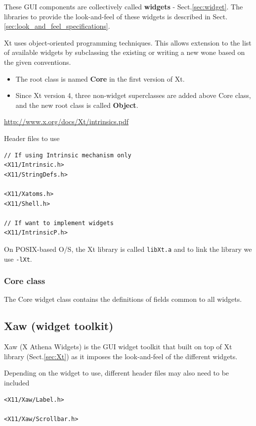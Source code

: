 These GUI components are collectively called {\bf widgets} -
Sect.\ref{sec:widget}. The libraries to provide the look-and-feel of these
widgets is described in Sect.\ref{sec:look_and_feel_specifications}.

Xt uses object-oriented programming techniques. This
allows extension to the list of available widgets by subclassing the existing or
writing a new wone based on the given conventions.
\begin{itemize}
  \item The root class is named {\bf Core} in the first version of Xt.
  
  \item Since Xt version 4, three non-widget superclasses are added above Core
  class, and the new root class is called {\bf Object}.
\end{itemize}
\url{http://www.x.org/docs/Xt/intrinsics.pdf}

Header files to use
\begin{verbatim}
// If using Intrinsic mechanism only
<X11/Intrinsic.h>
<X11/StringDefs.h>

<X11/Xatoms.h>
<X11/Shell.h>

// If want to implement widgets
<X11/IntrinsicP.h>
\end{verbatim}

\begin{mdframed}

On POSIX-based O/S, the Xt library is called \verb!libXt.a! and to link the
library we use \verb!-lXt!.
\end{mdframed}

\subsubsection{Core class}
\label{sec:Core_class}

The Core widget class contains the definitions of fields common to all widgets.


\subsection{Xaw (widget toolkit)}
\label{sec:Xaw}

Xaw (X Athena Widgets) is the GUI widget toolkit that built on top of Xt
library (Sect.\ref{sec:Xt}) as it imposes the look-and-feel of the different
widgets.

Depending on the widget to use, different header
files may also need to be included
\begin{verbatim}
<X11/Xaw/Label.h>

<X11/Xaw/Scrollbar.h>
\end{verbatim}

